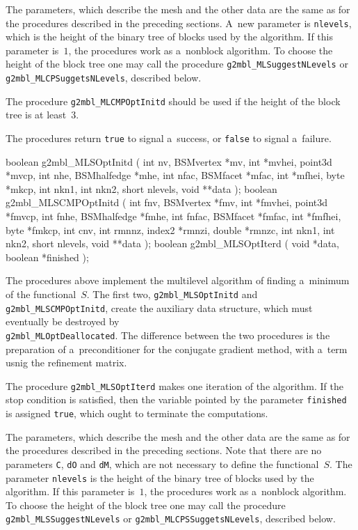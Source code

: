 The parameters, which describe the mesh and the other data are the same as
for the procedures described in the preceding sections. A~new parameter is
\texttt{nlevels}, which is the height of the binary tree of blocks used by
the algorithm. If this parameter is~$1$, the procedures work as a~nonblock
algorithm. To choose the height of the block tree one may call the procedure
\texttt{g2mbl\_MLSuggestNLevels} or \texttt{g2mbl\_MLCPSuggetsNLevels},
described below.

The procedure \texttt{g2mbl\_MLCMPOptInitd} should be used if the height of
the block tree is at least~$3$.

The procedures return \texttt{true} to signal a~success, or \texttt{false}
to signal a~failure.


\begin{listingC}
boolean g2mbl_MLSOptInitd (
                    int nv, BSMvertex *mv, int *mvhei, point3d *mvcp,
                    int nhe, BSMhalfedge *mhe,
                    int nfac, BSMfacet *mfac, int *mfhei,
                    byte *mkcp,
                    int nkn1, int nkn2, short nlevels, void **data );
boolean g2mbl_MLSCMPOptInitd (
              int fnv, BSMvertex *fmv, int *fmvhei, point3d *fmvcp,
              int fnhe, BSMhalfedge *fmhe,
              int fnfac, BSMfacet *fmfac, int *fmfhei,
              byte *fmkcp,
              int cnv,
              int rmnnz, index2 *rmnzi, double *rmnzc,
              int nkn1, int nkn2, short nlevels,  
              void **data );
boolean g2mbl_MLSOptIterd ( void *data, boolean *finished );
\end{listingC}
The procedures above implement the multilevel algorithm of finding a~minimum
of the functional~$S$. The first two, \texttt{g2mbl\_MLSOptInitd} and
\texttt{g2mbl\_MLSCMPOptInitd}, create the auxiliary data structure, which
must eventually be destroyed by \\
\texttt{g2mbl\_MLOptDeallocated}. The
difference between the two procedures is the preparation of a~preconditioner
for the conjugate gradient method, with a~term usnig the refinement matrix.

The procedure \texttt{g2mbl\_MLSOptIterd} makes one iteration of the
algorithm. If the stop condition is satisfied, then the variable pointed by
the parameter \texttt{finished} is assigned \texttt{true}, which ought to
terminate the computations.

The parameters, which describe the mesh and the other data are the same as
for the procedures described in the preceding sections. Note that there are
no parameters \texttt{C}, \texttt{dO} and \texttt{dM}, which are not
necessary to define the functional~$S$.
The parameter \texttt{nlevels} is the height of the binary tree of blocks used by
the algorithm. If this parameter is~$1$, the procedures work as a~nonblock
algorithm. To choose the height of the block tree one may call the procedure
\texttt{g2mbl\_MLSSuggestNLevels} or \texttt{g2mbl\_MLCPSSuggetsNLevels},
described below.



